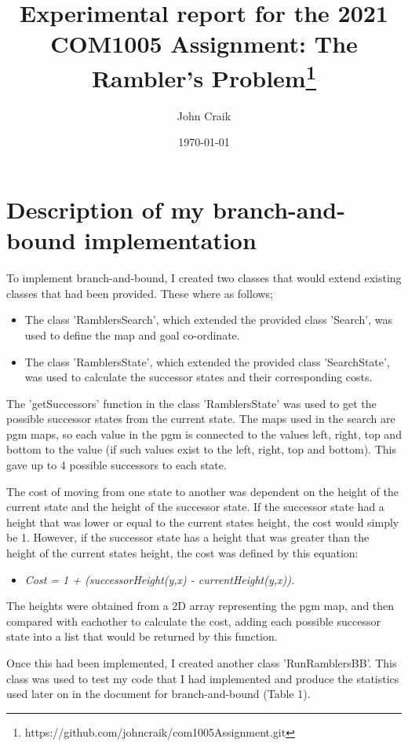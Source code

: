 \documentclass[11pt,oneside]{article}
\title{Experimental report for the 2021 COM1005 Assignment: The Rambler's Problem\footnote{https://github.com/johncraik/com1005Assignment.git}}
\author{John Craik}
\date{\today}
\begin{document}
\maketitle

\section{Description of my branch-and-bound implementation}
To implement branch-and-bound, I created two classes that would extend existing classes that had been provided. These where as follows;
\begin{itemize}
    \item The class 'RamblersSearch', which extended the provided class 'Search', was used to define the map and goal co-ordinate.
    \item The class 'RamblersState', which extended the provided class 'SearchState', was used to calculate the successor states and their corresponding costs.
\end{itemize}
The 'getSuccessors' function in the class 'RamblersState' was used to get the possible successor states from the current state. The maps used in the search are pgm maps, so each value in the pgm is connected to the values left, right, top and bottom to the value (if such values exist to the left, right, top and bottom). This gave up to 4 possible successors to each state.

The cost of moving from one state to another was dependent on the height of the current state and the height of the successor state. If the successor state had a height that was lower or equal to the current states height, the cost would simply be 1. However, if the successor state has a height that was greater than the height of the  current states height, the cost was defined by this equation:
\begin{itemize}
    \item \textit{Cost = 1 + (successorHeight(y,x) - currentHeight(y,x)).}
\end{itemize}
The heights were obtained from a 2D array representing the pgm map, and then compared with eachother to calculate the cost, adding each possible successor state into a list that would be returned by this function.

Once this had been implemented, I created another class 'RunRamblersBB'. This class was used to test my code that I had implemented and produce the statistics used later on in the document for branch-and-bound (Table 1).
\end{document}
